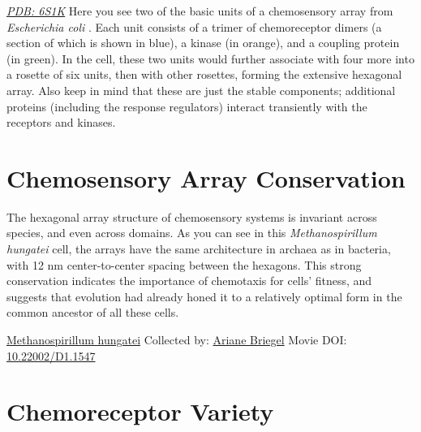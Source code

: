 \documentclass[]{tufte-book}
\begin{document}
\href{http://rcsb.org/structure/6S1K}{\emph{PDB: 6S1K}}
Here you see two of the basic units of a chemosensory array from \emph{Escherichia coli} \citep{cassidy2020}. Each unit consists of a trimer of chemoreceptor dimers (a section of which is shown in blue), a kinase (in orange), and a coupling protein (in green). In the cell, these two units would further associate with four more into a rosette of six units, then with other rosettes, forming the extensive hexagonal array. Also keep in mind that these are just the stable components; additional proteins (including the response regulators) interact transiently with the receptors and kinases.

\hypertarget{chemosensory-array-conservation}{%
\section{Chemosensory Array Conservation}\label{chemosensory-array-conservation}}

The hexagonal array structure of chemosensory systems is invariant across species, and even across domains. As you can see in this \emph{Methanospirillum hungatei} cell, the arrays have the same architecture in archaea as in bacteria, with 12 nm center-to-center spacing between the hexagons. This strong conservation indicates the importance of chemotaxis for cells' fitness, and suggests that evolution had already honed it to a relatively optimal form in the common ancestor of all these cells.



\hypertarget{htmlwidget-4b38bad15f9ee6df1e64}{}

\label{fig:7-3}\protect\hyperlink{tree}{Methanospirillum hungatei} Collected by: \protect\hyperlink{ariane_briegel}{Ariane Briegel} Movie DOI: \href{https://doi.org/10.22002/D1.1547}{10.22002/D1.1547}

\hypertarget{chemoreceptor-variety}{%
\section{Chemoreceptor Variety}\label{chemoreceptor-variety}}
\end{document}
